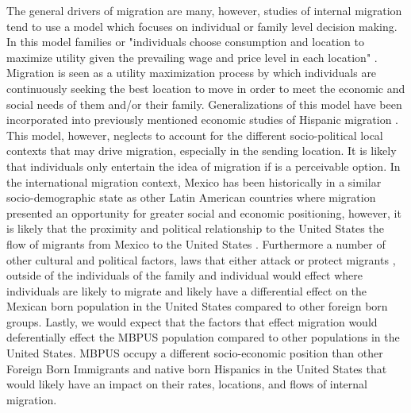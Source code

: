 \documentclass[fleqn,12pt]{olplainarticle}
\begin{document}
The general drivers of migration are many, however, studies of internal migration tend to use a model which focuses on individual or family level decision making. 
In this model families or "individuals choose consumption and location to maximize utility given the prevailing wage and price level in each location"  \citep{ Molloy2011a}.
Migration is seen as a utility maximization process by which individuals are continuously seeking the best location to move in order to meet the economic and social needs of them and/or their family.
Generalizations of this model have been incorporated into previously mentioned economic studies of Hispanic migration \citep{Light2009, Card2005, Lichter2009}.
This model, however, neglects to account for the different socio-political local contexts that may drive migration, especially in the sending location.
It is likely that individuals only entertain the idea of migration if is a perceivable option.
In the international migration context, Mexico has been historically in a similar socio-demographic state as other Latin American countries where migration presented an opportunity for greater social and economic positioning, however, it is likely that the proximity and political relationship to the United States the flow of migrants from Mexico to the United States \citep{Massey2009}. 
Furthermore a number of other cultural and political factors, laws that either attack or protect migrants  \citep{Ellis2016}, outside of the individuals of the family and individual would effect where individuals are likely to migrate and likely have a differential effect on the Mexican born population in the United States compared to other foreign born groups.
Lastly, we would expect that the factors that effect migration would deferentially effect the MBPUS population compared to other populations in the United States.
MBPUS occupy a different socio-economic position than other Foreign Born Immigrants and native born Hispanics in the United States that would likely have an impact on their rates, locations, and flows of internal migration.  
\end{document}

